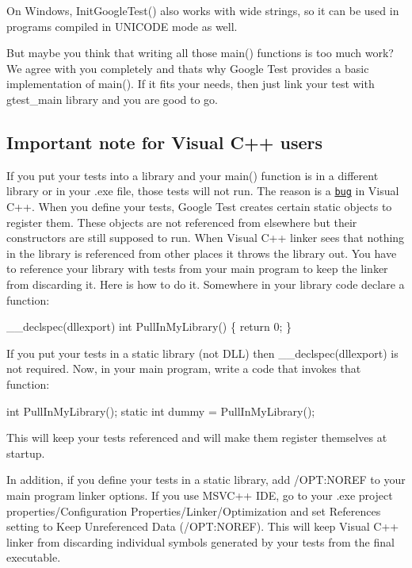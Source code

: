 On Windows, {\ttfamily Init\+Google\+Test()} also works with wide strings, so it can be used in programs compiled in {\ttfamily U\+N\+I\+C\+O\+DE} mode as well.

But maybe you think that writing all those main() functions is too much work? We agree with you completely and that\textquotesingle{}s why Google Test provides a basic implementation of main(). If it fits your needs, then just link your test with gtest\+\_\+main library and you are good to go.

\subsection*{Important note for Visual C++ users}

If you put your tests into a library and your {\ttfamily main()} function is in a different library or in your .exe file, those tests will not run. The reason is a \href{https://connect.microsoft.com/feedback/viewfeedback.aspx?FeedbackID=244410&siteid=210}{\tt bug} in Visual C++. When you define your tests, Google Test creates certain static objects to register them. These objects are not referenced from elsewhere but their constructors are still supposed to run. When Visual C++ linker sees that nothing in the library is referenced from other places it throws the library out. You have to reference your library with tests from your main program to keep the linker from discarding it. Here is how to do it. Somewhere in your library code declare a function\+: 
\begin{DoxyCode}
\_\_declspec(dllexport) int PullInMyLibrary() \{ return 0; \}
\end{DoxyCode}
 If you put your tests in a static library (not D\+LL) then {\ttfamily \+\_\+\+\_\+declspec(dllexport)} is not required. Now, in your main program, write a code that invokes that function\+: 
\begin{DoxyCode}
int PullInMyLibrary();
static int dummy = PullInMyLibrary();
\end{DoxyCode}
 This will keep your tests referenced and will make them register themselves at startup.

In addition, if you define your tests in a static library, add {\ttfamily /\+O\+PT\+:N\+O\+R\+EF} to your main program linker options. If you use M\+S\+V\+C++ I\+DE, go to your .exe project properties/\+Configuration Properties/\+Linker/\+Optimization and set References setting to {\ttfamily Keep Unreferenced Data (/\+O\+PT\+:N\+O\+R\+EF)}. This will keep Visual C++ linker from discarding individual symbols generated by your tests from the final executable.

